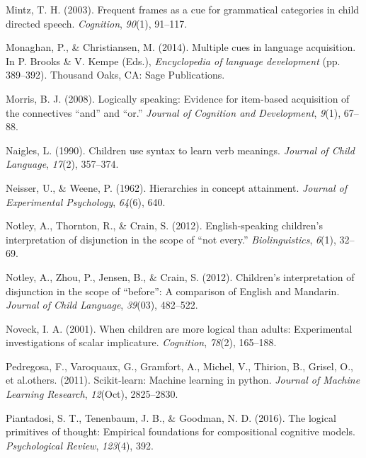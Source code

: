 \documentclass[
  ,man,floatsintext]{apa6}
\newlength{\cslhangindent}
\newlength{\cslentryspacingunit} %
\newenvironment{CSLReferences}[2] %
 {%
  \setlength{\parindent}{0pt}
  \ifodd #1
  \let\oldpar\par
  \def\par{\hangindent=\cslhangindent\oldpar}
  \fi
  \setlength{\parskip}{#2\cslentryspacingunit}
 }%
 {}
\begin{document}
\begin{CSLReferences}{1}{0}
\leavevmode{}%
Mintz, T. H. (2003). Frequent frames as a cue for grammatical categories in child directed speech. \emph{Cognition}, \emph{90}(1), 91--117.

\leavevmode{}%
Monaghan, P., \& Christiansen, M. (2014). Multiple cues in language acquisition. In P. Brooks \& V. Kempe (Eds.), \emph{Encyclopedia of language development} (pp. 389--392). Thousand Oaks, CA: Sage Publications.

\leavevmode{}%
Morris, B. J. (2008). Logically speaking: Evidence for item-based acquisition of the connectives {``and''} and {``or.''} \emph{Journal of Cognition and Development}, \emph{9}(1), 67--88.

\leavevmode{}%
Naigles, L. (1990). Children use syntax to learn verb meanings. \emph{Journal of Child Language}, \emph{17}(2), 357--374.

\leavevmode{}%
Neisser, U., \& Weene, P. (1962). Hierarchies in concept attainment. \emph{Journal of Experimental Psychology}, \emph{64}(6), 640.

\leavevmode{}%
Notley, A., Thornton, R., \& Crain, S. (2012). English-speaking children's interpretation of disjunction in the scope of {``not every.''} \emph{Biolinguistics}, \emph{6}(1), 32--69.

\leavevmode{}%
Notley, A., Zhou, P., Jensen, B., \& Crain, S. (2012). Children's interpretation of disjunction in the scope of {``before''}: A comparison of {English} and {M}andarin. \emph{Journal of Child Language}, \emph{39}(03), 482--522.

\leavevmode{}%
Noveck, I. A. (2001). When children are more logical than adults: Experimental investigations of scalar implicature. \emph{Cognition}, \emph{78}(2), 165--188.

\leavevmode{}%
Pedregosa, F., Varoquaux, G., Gramfort, A., Michel, V., Thirion, B., Grisel, O., et al.others. (2011). Scikit-learn: Machine learning in python. \emph{Journal of Machine Learning Research}, \emph{12}(Oct), 2825--2830.

\leavevmode{}%
Piantadosi, S. T., Tenenbaum, J. B., \& Goodman, N. D. (2016). The logical primitives of thought: Empirical foundations for compositional cognitive models. \emph{Psychological Review}, \emph{123}(4), 392.


\end{CSLReferences}
\end{document}
